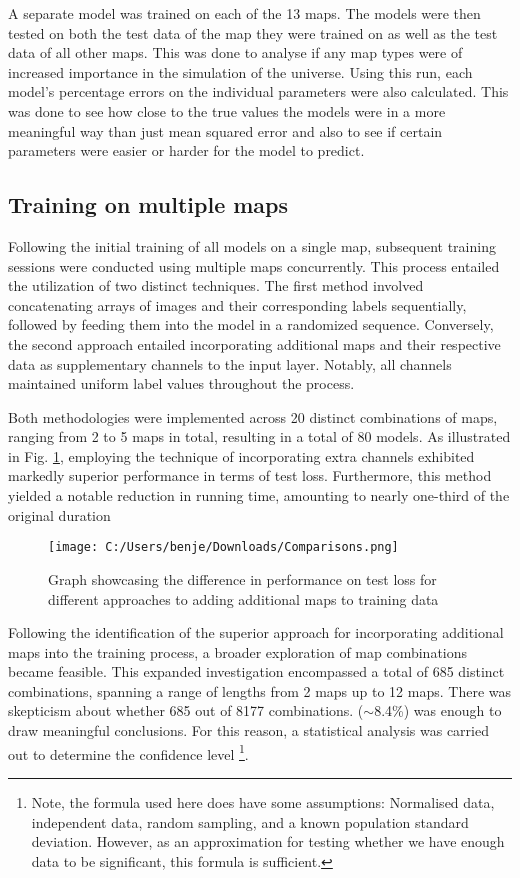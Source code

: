 \documentclass[11pt]{scrartcl}
\begin{document}
A separate model was trained on each of the 13 maps. The models were then tested on both the test data of the map they were trained on as well as the test data of all other maps. This was done to analyse if any map types were of increased importance in the simulation of the universe. Using this run, each model's percentage errors on the individual parameters were also calculated. This was done to see how close to the true values the models were in a more meaningful way than just mean squared error and also to see if certain parameters were easier or harder for the model to predict.

 \subsection{Training on multiple maps}
\label{multimult}

Following the initial training of all models on a single map, subsequent training sessions were conducted using multiple maps concurrently. This process entailed the utilization of two distinct techniques. The first method involved concatenating arrays of images and their corresponding labels sequentially, followed by feeding them into the model in a randomized sequence. Conversely, the second approach entailed incorporating additional maps and their respective data as supplementary channels to the input layer. Notably, all channels maintained uniform label values throughout the process.

Both methodologies were implemented across 20 distinct combinations of maps, ranging from 2 to 5 maps in total, resulting in a total of 80 models. As illustrated in Fig. \ref{CompFIG}, employing the technique of incorporating extra channels exhibited markedly superior performance in terms of test loss. Furthermore, this method yielded a notable reduction in running time, amounting to nearly one-third of the original duration

\begin{figure}[H]
\centering
\texttt{[image: C:/Users/benje/Downloads/Comparisons.png]}
\caption{Graph showcasing the difference in performance on test loss for different approaches to adding additional maps to training data}
\label{CompFIG}
\end{figure}

Following the identification of the superior approach for incorporating additional maps into the training process, a broader exploration of map combinations became feasible. This expanded investigation encompassed a total of 685 distinct combinations, spanning a range of lengths from 2 maps up to 12 maps. There was skepticism about whether 685 out of 8177 combinations. ($\sim$8.4\%) was enough to draw meaningful conclusions. For this reason, a statistical analysis was carried out to determine the confidence level \footnote{Note, the formula used here does have some assumptions: Normalised data, independent data, random sampling, and a known population standard deviation. However, as an approximation for testing whether we have enough data to be significant, this formula is sufficient.}. 
\end{document}
